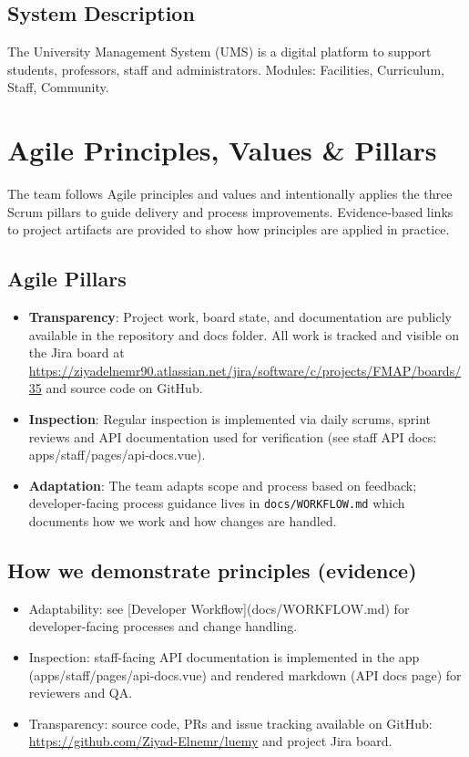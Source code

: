 \documentclass[12pt,a4paper]{article}
\begin{document}
\subsection{System Description}

The University Management System (UMS) is a digital platform to support students, professors, staff and administrators. Modules: Facilities, Curriculum, Staff, Community.

\section{Agile Principles, Values \& Pillars}

The team follows Agile principles and values and intentionally applies the three Scrum pillars to guide delivery and process improvements. Evidence-based links to project artifacts are provided to show how principles are applied in practice.

\subsection*{Agile Pillars}
\begin{itemize}
\item \textbf{Transparency}: Project work, board state, and documentation are publicly available in the repository and docs folder. All work is tracked and visible on the Jira board at \url{https://ziyadelnemr90.atlassian.net/jira/software/c/projects/FMAP/boards/35} and source code on GitHub.
\item \textbf{Inspection}: Regular inspection is implemented via daily scrums, sprint reviews and API documentation used for verification (see staff API docs: apps/staff/pages/api-docs.vue).
\item \textbf{Adaptation}: The team adapts scope and process based on feedback; developer-facing process guidance lives in \texttt{docs/WORKFLOW.md} which documents how we work and how changes are handled.
\end{itemize}

\subsection*{How we demonstrate principles (evidence)}
\begin{itemize}
\item Adaptability: see [Developer Workflow](docs/WORKFLOW.md) for developer-facing processes and change handling.
\item Inspection: staff-facing API documentation is implemented in the app (apps/staff/pages/api-docs.vue) and rendered markdown (API docs page) for reviewers and QA.
\item Transparency: source code, PRs and issue tracking available on GitHub: \url{https://github.com/Ziyad-Elnemr/luemy} and project Jira board.
\end{itemize}
\end{document}
